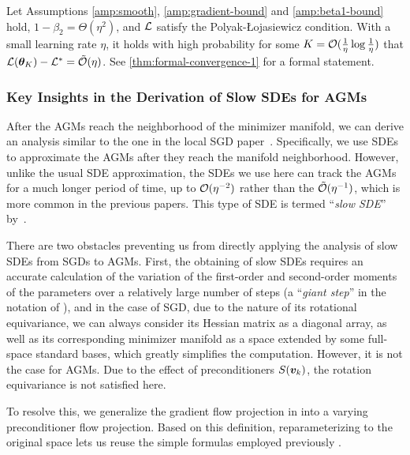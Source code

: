 


\begin{theorem}\label{thm: convergence}
Let Assumptions \ref{amp:smooth}, \ref{amp:gradient-bound} and \ref{amp:beta1-bound} hold, $1-\beta_2 = \Theta(\eta^2)$, and $\mathcal{L}$ satisfy the Polyak-Łojasiewicz condition. With a small learning rate $\eta$, it holds with high probability for some $K = \mathcal{O}(\frac{1}{\eta}\log\frac{1}{\eta})$ that $\mathcal{L}({\bm{\theta}}_{K})-\mathcal{L}^* = \tilde{\mathcal{O}}(\eta)$. See \cref{thm:formal-convergence-1} for a formal statement.
\end{theorem}
\subsubsection{Key Insights in the Derivation of Slow SDEs for AGMs}
After the AGMs reach the neighborhood of the minimizer manifold, we can derive an analysis similar to the one in the local SGD paper~\citep{gu2023and}. Specifically, we use SDEs to approximate the AGMs after they reach the manifold neighborhood. However, unlike the usual SDE approximation, the SDEs we use here can track the AGMs for a much longer period of time, up to $\mathcal{O}(\eta^{-2})$ rather than the $\tilde{\mathcal{O}}(\eta^{-1})$, which is more common in the previous papers. This type of SDE is termed ``\textit{slow SDE}'' by~\citet{gu2023and}.

 There are two obstacles preventing us from directly applying the analysis of slow SDEs from SGDs to AGMs. First, the obtaining of slow SDEs requires an accurate calculation of the variation of the first-order and second-order moments of the parameters over a relatively large number of steps (a ``\textit{giant step}'' in the notation of \citet{gu2023and}), and in the case of SGD, due to the nature of its rotational equivariance, we can always consider its Hessian matrix as a diagonal array, as well as its corresponding minimizer manifold as a space extended by some full-space standard bases, which greatly simplifies the computation. However, it is not the case for AGMs. Due to the effect of preconditioners $S({\bm{v}}_k)$, the rotation equivariance is not satisfied here. 
 
 To resolve this, we generalize the gradient flow projection in \citet{gu2023and,li2021happens} into a varying preconditioner flow projection. Based on this definition, reparameterizing to the original space lets us reuse the simple formulas employed previously \citep{gu2023and,li2021happens}.
 
